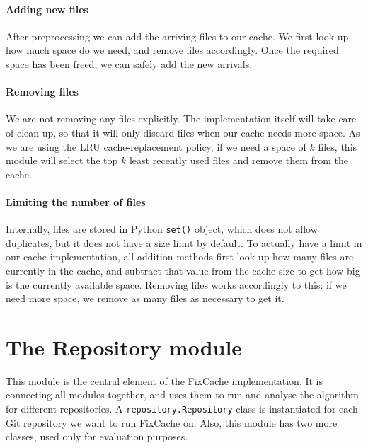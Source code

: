 \documentclass[12pt,twoside,notitlepage]{report}
\newcommand{\fxch}{FixCache}
\begin{document}
\paragraph{Adding new files} After preprocessing we can add the arriving files to our cache. We first look-up how much space do we need, and remove files accordingly. Once the required space has been freed, we can safely add the new arrivals.

\paragraph{Removing files} We are not removing any files explicitly. The implementation itself will take care of clean-up, so that it will only discard files when our cache needs more space. As we are using the LRU cache-replacement policy, if we need a space of $k$ files, this module will select the top $k$ least recently used files and remove them from the cache.

\paragraph{Limiting the number of files}
Internally, files are stored in Python \texttt{set()} object, which does not allow duplicates, but it does not have a size limit by default. To actually have a limit in our cache implementation, all addition methods first look up how many files are currently in the cache, and subtract that value from the cache size to get how big is the currently available space. Removing files works accordingly to this: if we need more space, we remove as many files as necessary to get it.
\section{The Repository module}
This module is the central element of the \fxch{} implementation. It is connecting all modules together, and uses them to run and analyse the algorithm for different repositories. A \texttt{repository.Repository} class is instantiated for each Git repository we want to run \fxch{} on. Also, this module has two more classes, used only for evaluation purposes.
\clearpage
\end{document}
